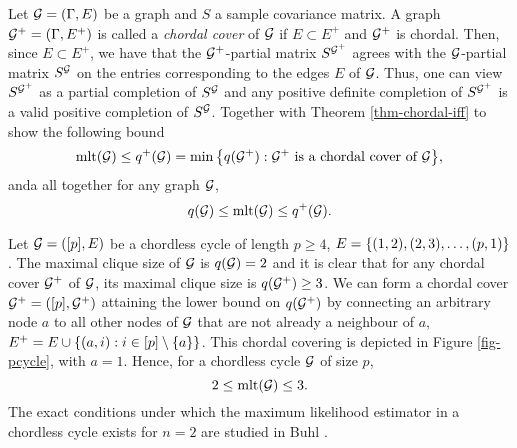 Let ${\mathcal{G}} = (\Gamma, E)$ be a graph and $S$ a sample covariance matrix. A graph ${\mathcal{G}}^+ = (\Gamma, E^+)$ is called a \textit{chordal cover} of ${\mathcal{G}}$ if $E \subset E^+$ and ${\mathcal{G}}^+$ is chordal. Then, since $E \subset E^+$, we have that the ${\mathcal{G}}^+$-partial matrix $S^{{\mathcal{G}}^+}$ agrees with the ${\mathcal{G}}$-partial matrix $S^{\mathcal{G}}$ on the entries corresponding to the edges $E$ of ${\mathcal{G}}$. Thus, one can view $S^{{\mathcal{G}}^+}$ as a partial completion of $S^{\mathcal{G}}$ and any positive definite completion of $S^{{\mathcal{G}}^+}$ is a valid positive completion of $S^{\mathcal{G}}$. Together with Theorem \ref{thm-chordal-iff} to show the following bound
\begin{equation*}
    {\textrm{mlt}}({\mathcal{G}}) \leq q^+({\mathcal{G}}) = \min {\left\{ q({\mathcal{G}}^+) : {\mathcal{G}}^+ {\textrm{ is a chordal cover of }} {\mathcal{G}}\right\}},
\end{equation*}
anda all together for any graph ${\mathcal{G}}$,
\begin{equation} \label{eq-mlt-bounds}
    q({\mathcal{G}}) \leq {\textrm{mlt}}({\mathcal{G}}) \leq q^+({\mathcal{G}}).
\end{equation}



\begin{example}
    Let ${\mathcal{G}} = ([p], E)$ be a chordless cycle of length $p \geq 4$, $E = {\left\{ (1, 2), (2, 3), \ldots, (p, 1)\right\}}$. The maximal clique size of ${\mathcal{G}}$ is $q({\mathcal{G}}) = 2$ and it is clear that for any chordal cover ${\mathcal{G}}^+$ of ${\mathcal{G}}$, its maximal clique size is $q({\mathcal{G}}^+) \geq 3$. We can form a chordal cover ${\mathcal{G}}^+ = ([p], {\mathcal{G}}^+)$ attaining the lower bound on $q({\mathcal{G}}^+)$ by connecting an arbitrary node $a$ to all other nodes of ${\mathcal{G}}$ that are not already a neighbour of $a$, $E^+ = E \cup {\left\{ (a, i) : i \in [p] \setminus {\left\{a\right\}}\right\}}$. This chordal covering is depicted in Figure \ref{fig-pcycle}, with $a = 1$. Hence, for a chordless cycle ${\mathcal{G}}$ of size $p$,
    \begin{equation*}
        2 \leq {\textrm{mlt}}({\mathcal{G}}) \leq 3.
    \end{equation*}
    The exact conditions under which the maximum likelihood estimator in a chordless cycle exists for $n = 2$ are studied in Buhl \cite[Section 4]{Buhl1993OnTE}.
\end{example}


